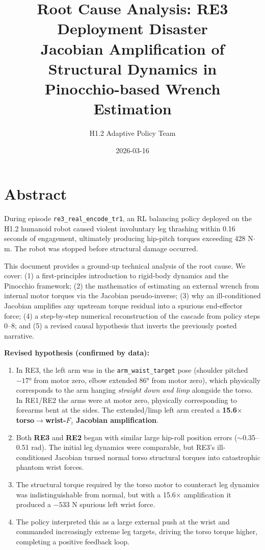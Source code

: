 \documentclass[11pt,a4paper]{article}
\title{\textbf{Root Cause Analysis: RE3 Deployment Disaster}\\[0.4em]
       \large Jacobian Amplification of Structural Dynamics in\\
       Pinocchio-based Wrench Estimation}
\author{H1.2 Adaptive Policy Team}
\date{2026-03-16}
\newcommand{\re}[1]{\textcolor{red3}{\textbf{#1}}}
\newcommand{\good}[1]{\textcolor{blue2}{\textbf{#1}}}
\begin{document}
\maketitle
\tableofcontents
\newpage

\section{Abstract}

During episode \texttt{re3\_real\_encode\_tr1}, an RL balancing policy
deployed on the H1.2 humanoid robot caused violent involuntary leg
thrashing within 0.16 seconds of engagement, ultimately producing hip-pitch
torques exceeding 428 N$\cdot$m.  The robot was stopped before structural
damage occurred.

This document provides a ground-up technical analysis of the root cause.
We cover: (1) a first-principles introduction to rigid-body dynamics
and the Pinocchio framework; (2) the mathematics of estimating an external
wrench from internal motor torques via the Jacobian pseudo-inverse; (3) why
an ill-conditioned Jacobian amplifies any upstream torque residual into a
spurious end-effector force; (4) a step-by-step numerical reconstruction of
the cascade from policy steps 0--8; and (5) a revised causal hypothesis that
inverts the previously posted narrative.

\medskip
\noindent\textbf{Revised hypothesis (confirmed by data):}
\begin{enumerate}
\item In RE3, the left arm was in the \texttt{arm\_waist\_target} pose
      (shoulder pitched $-17°$ from motor zero, elbow extended $86°$ from
      motor zero), which physically corresponds to the arm hanging
      \emph{straight down and limp} alongside the torso.  In RE1/RE2 the
      arms were at motor zero, physically corresponding to forearms
      bent at the sides.  The extended/limp left arm created a
      \textbf{15.6$\times$ torso$\to$wrist-$F_z$ Jacobian amplification}.
\item Both \re{RE3} and \good{RE2} began with similar large hip-roll
      position errors ($\sim$0.35--0.51 rad).  The initial leg dynamics
      were comparable, but RE3's ill-conditioned Jacobian turned normal
      torso structural torques into catastrophic phantom wrist forces.
\item The structural torque required by the torso motor to counteract leg
      dynamics was indistinguishable from normal, but with a 15.6$\times$
      amplification it produced a $-533$ N spurious left wrist force.
\item The policy interpreted this as a large external push at the wrist and
      commanded increasingly extreme leg targets, driving the torso torque
      higher, completing a positive feedback loop.
\end{enumerate}
\end{document}
